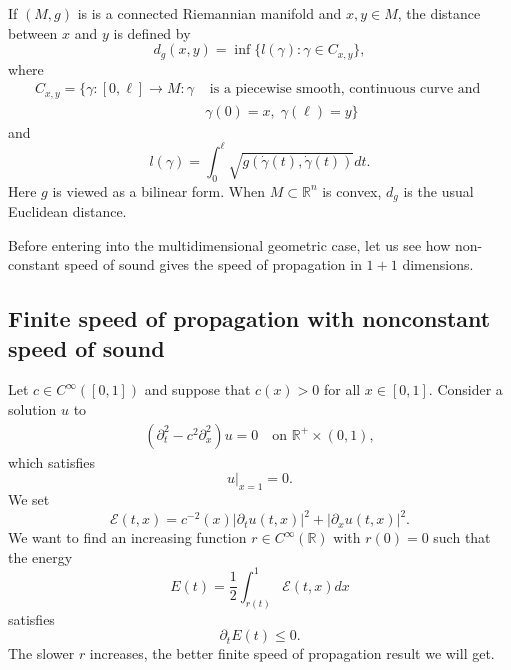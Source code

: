 \documentclass[12pt,oneside,final]{amsart}
\def\R{\mathbb R}
\begin{document}
If $(M,g)$ is is a connected Riemannian manifold and $x,y\in M$, the
distance between $x$ and $y$ is defined by
\begin{equation*}
	d_g(x,y) = \inf \{ l(\gamma):  \gamma\in C_{x,y}\},
\end{equation*}
where 
\begin{align*}
	C_{x,y} = \{ \gamma:[0,\ell] \rightarrow M: \gamma &\text{ is a piecewise smooth, continuous curve and }  \\&\gamma(0) = x, \; \gamma(\ell) = y \}
\end{align*}
and
\begin{equation*}
	l(\gamma) = \int_{0}^{\ell}  \sqrt{g(\dot{\gamma}(t), \dot{\gamma}(t))} dt. 
\end{equation*}
Here $g$ is viewed as a bilinear form. 
When $M \subset \R^n$ is convex, $d_g$ is the usual Euclidean distance.


Before entering into the multidimensional geometric case, let us see how non-constant speed of sound gives the speed of propagation in $1+1$ dimensions.

\subsection{Finite speed of propagation with nonconstant speed of sound}

Let $c \in C^\infty([0,1])$ and suppose that $c(x) > 0$ for all $x \in [0,1]$.
Consider a solution $u$ to 
    \begin{align}\label{eq_wave_c}
		(\partial_t^2 - c^2 \partial_x^2) u = 0 \quad \text{on } \mathbb{R}^+\times (0,1),
    \end{align}
which satisfies 
\begin{equation*}
	\left.u\right|_{x=1} = 0.
\end{equation*}
We set
\begin{equation*}
	\mathcal{E}(t,x)  = c^{-2}(x)|\partial_t u(t,x)|^2 + |\partial_x u(t,x)|^2.
\end{equation*}
We want to find an increasing function $r \in C^\infty(\R)$ with $r(0) = 0$ such that the energy
\begin{equation*}
	E(t) = \frac{1}{2} \int_{r(t)}^{1} \mathcal{E}(t,x) dx
\end{equation*}
satisfies
\begin{equation}\label{partial E}
	\partial_tE(t) \leq 0.
\end{equation}
The slower $r$ increases, the better finite speed of propagation result we will get. 
\end{document}
